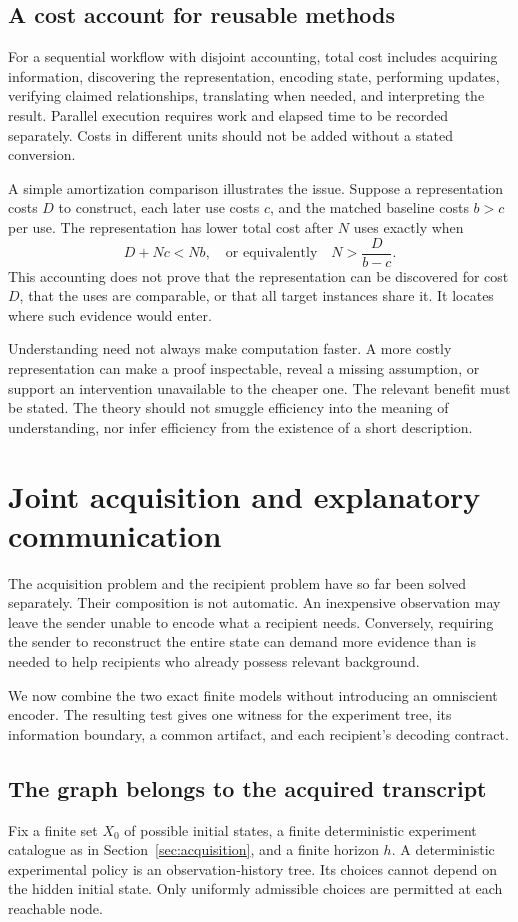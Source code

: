 \documentclass[11pt,letterpaper]{article}
\theoremstyle{plain}
\theoremstyle{definition}
\begin{document}
\subsection{A cost account for reusable methods}
For a sequential workflow with disjoint accounting, total cost includes acquiring information, discovering the representation, encoding state, performing updates, verifying claimed relationships, translating when needed, and interpreting the result. Parallel execution requires work and elapsed time to be recorded separately. Costs in different units should not be added without a stated conversion.

A simple amortization comparison illustrates the issue. Suppose a representation costs $D$ to construct, each later use costs $c$, and the matched baseline costs $b>c$ per use. The representation has lower total cost after $N$ uses exactly when
\[
D+Nc<Nb,\quad\text{or equivalently}\quad N>\frac{D}{b-c}.
\]
This accounting does not prove that the representation can be discovered for cost $D$, that the uses are comparable, or that all target instances share it. It locates where such evidence would enter.

Understanding need not always make computation faster. A more costly representation can make a proof inspectable, reveal a missing assumption, or support an intervention unavailable to the cheaper one. The relevant benefit must be stated. The theory should not smuggle efficiency into the meaning of understanding, nor infer efficiency from the existence of a short description.

\section{Joint acquisition and explanatory communication}\label{sec:joint-synthesis}
The acquisition problem and the recipient problem have so far been solved separately. Their composition is not automatic. An inexpensive observation may leave the sender unable to encode what a recipient needs. Conversely, requiring the sender to reconstruct the entire state can demand more evidence than is needed to help recipients who already possess relevant background.

We now combine the two exact finite models without introducing an omniscient encoder. The resulting test gives one witness for the experiment tree, its information boundary, a common artifact, and each recipient's decoding contract.

\subsection{The graph belongs to the acquired transcript}
Fix a finite set $X_0$ of possible initial states, a finite deterministic experiment catalogue as in Section~\ref{sec:acquisition}, and a finite horizon $h$. A deterministic experimental policy is an observation-history tree. Its choices cannot depend on the hidden initial state. Only uniformly admissible choices are permitted at each reachable node.
\end{document}
